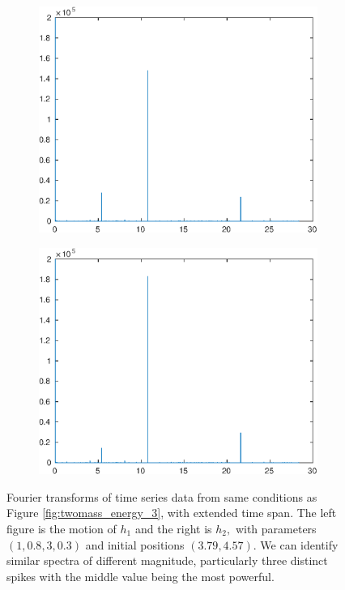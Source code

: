 \begin{figure}[h!]
	\begin{subfigure}[b]{0.5\textwidth}
		\includegraphics[width=\textwidth]{voiced_sounds/case_1/most_stable_resulta.eps}
	\end{subfigure}
	\begin{subfigure}[b]{0.5\textwidth}
		\includegraphics[width=\textwidth]{voiced_sounds/case_1/most_stable_resultb.eps}
	\end{subfigure}
	\caption{
		Fourier transforms of time series data from same conditions as Figure \ref{fig:twomass_energy_3}, with extended time span.
		The left figure is the motion of $h_1$ and the right is $h_2,$ with parameters \((1, 0.8, 3, 0.3)\) and initial positions $(3.79,4.57)$.
		We can identify similar spectra of different magnitude,
		particularly three distinct spikes with the middle value being the most powerful.
	}
	\label{fig:twomass_fourier_first}
\end{figure} %

